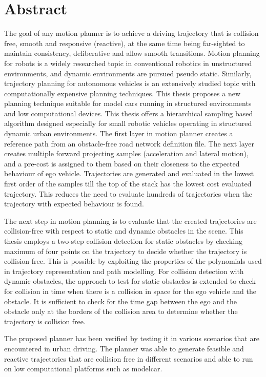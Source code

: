 \chapter*{Abstract}
The goal of any motion planner is to achieve a driving trajectory that is collision free, smooth and responsive (reactive), at the same time being far-sighted to maintain consistency, deliberative and allow smooth transitions. Motion planning for robots is a widely researched topic in conventional robotics in unstructured environments, and dynamic environments are pursued pseudo static. Similarly, trajectory planning for autonomous vehicles is an extensively studied topic with computationally expensive planning techniques. This thesis proposes a new planning technique suitable for model cars running in structured environments and low computational devices. This thesis offers a hierarchical sampling based algorithm designed especially for small robotic vehicles operating in structured dynamic urban environments. The first layer in motion planner creates a reference path from an obstacle-free road network definition file. The next layer creates multiple forward projecting samples (acceleration and lateral motion), and a pre-cost is assigned to them based on their closeness to the expected behaviour of ego vehicle. Trajectories are generated and evaluated in the lowest first order of the samples till the top of the stack has the lowest cost evaluated trajectory. This reduces the need to evaluate hundreds of trajectories when the trajectory with expected behaviour is found. 

The next step in motion planning is to evaluate that the created trajectories are collision-free with respect to static and dynamic obstacles in the scene. This thesis employs a two-step collision detection for static obstacles by checking maximum of four points on the trajectory to decide whether the trajectory is collision free. This is possible by exploiting the properties of the polynomials used in trajectory representation and path modelling. For collision detection with dynamic obstacles, the approach to test for static obstacles is extended to check for collision in time when there is a collision in space for the ego vehicle and the obstacle. It is sufficient to check for the time gap between the ego and the obstacle only at the borders of the collision area to determine whether the trajectory is collision free. 

The proposed planner has been verified by testing it in various scenarios that are encountered in urban driving. The planner was able to generate feasible and reactive trajectories that are collision free in different scenarios and able to run on low computational platforms such as modelcar. 
